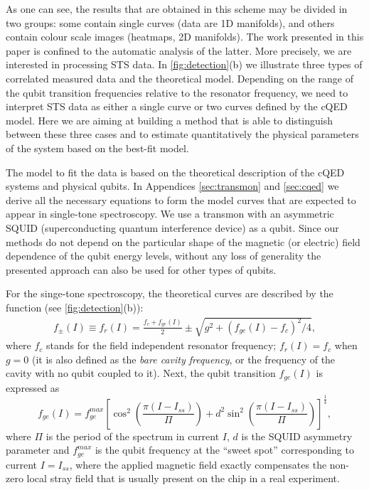 \documentclass[%
 aip,
 amsmath,amssymb,
 reprint,%
]{revtex4-1}
\begin{document}
As one can see, the results that are obtained in this scheme may be divided in two groups: some contain single curves (data are 1D manifolds), and others contain colour scale images (heatmaps, 2D manifolds). The work presented in this paper is confined to the automatic analysis of the latter. More precisely, we are interested in processing STS data. In \autoref{fig:detection}(b) we illustrate three types of correlated measured data and the theoretical model. Depending on the range of the qubit transition frequencies relative to the resonator frequency, we need to interpret STS data as either a single curve or two curves defined by the cQED model. Here we are aiming at building a method that is able to distinguish between these three cases and to estimate quantitatively the physical parameters of the system based on the best-fit model. 

The model to fit the data is based on the theoretical description of the cQED systems and physical qubits. In Appendices \ref{sec:transmon} and \ref{sec:cqed} we derive all the necessary equations to form the model curves that are expected to appear in single-tone spectroscopy. We use a transmon\cite{koch2007} with an asymmetric SQUID (superconducting quantum interference device) as a qubit. Since our methods do not depend on the particular shape of the magnetic (or electric) field dependence of the qubit energy levels, without any loss of generality the presented approach can also be used for other types of qubits.

For the singe-tone spectroscopy, the theoretical curves are described by the function (see \autoref{fig:detection}(b)):
\begin{align}
f_\pm(I) \equiv f_r(I) = \frac{f_c + f_{ge}(I)}{2} \pm \sqrt{g^2+(f_{ge}(I) - f_c)^2/4},\label{eq:f_r}
\end{align}
where $f_c$ stands for the field independent resonator frequency; $f_r(I) = f_c$ when $g=0$ (it is also defined as the \textit{bare cavity frequency}, or the frequency of the cavity with no qubit coupled to it). Next, the qubit transition $f_{ge}(I)$ is expressed as
\begin{equation}
f_{ge}(I) = f_{ge}^{max} \left[\cos^2\left(\frac{\pi(I-I_{ss})}{\Pi}\right)+d^2 \sin^2 \left(\frac{\pi(I-I_{ss})}{\Pi}\right)\right]^\frac{1}{4},
\label{eq:tr_spectrum}
\end{equation}
where $\Pi$ is the period of the spectrum in current $I$, $d$ is the SQUID asymmetry parameter and $f_{ge}^{max}$ is the qubit frequency at the ``sweet spot'' corresponding to current $I = I_{ss}$, where the applied magnetic field exactly compensates the non-zero local stray field that is usually present on the chip in a real experiment.
\end{document}
